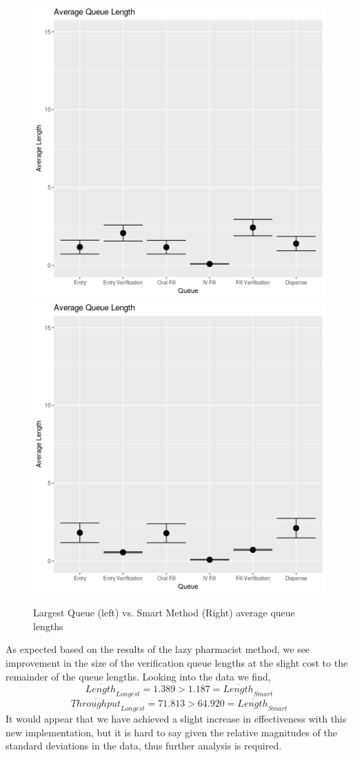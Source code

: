 \documentclass[10pt]{report}            %
\begin{document}
\begin{figure}[H]
\centering
\includegraphics[scale=.35]{LongestQueueCIs.png}
\includegraphics[scale=.35]{SmartQueueCIs.png}
\caption{Largest Queue (left) vs. Smart Method (Right) average queue lengths}
\label{fig:longvsmart}
\end{figure}
As expected based on the results of the lazy pharmacist method, we see improvement in the size of the verification queue lengths at the slight cost to the remainder of the queue lengths. Looking into the data we find,
\[\overline{Length}_{Longest}=1.389 > 1.187 = \overline{Length}_{Smart}\]
\[\overline{Throughput}_{Longest}=71.813 > 64.920 = \overline{Length}_{Smart}\]
It would appear that we have achieved a slight increase in effectiveness with this new implementation, but it is hard to say given the relative magnitudes of the standard deviations in the data, thus further analysis is required.
\end{document}
